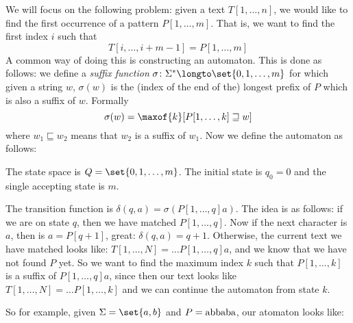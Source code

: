 We will focus on the following problem: given a text $T[1,\dots,n]$, we would like to find the first occurrence of a pattern $P[1,\dots,m]$.
That is, we want to find the first index $i$ such that
$$ T[i,\dots,i+m-1] = P[1,\dots,m] $$
A common way of doing this is constructing an automaton.
This is done as follows: we define a {\it suffix function} $\sigma\colon\Sigma^*\longto\set{0,1,\dots,m}$ for which given a string $w$, $\sigma(w)$ is the (index of the end of the) longest prefix of $P$
which is also a suffix of $w$.
Formally
$$ \sigma(w) = \maxof{k}[{P[1,\dots,k]\sqsupseteq w}] $$
where $w_1\sqsubseteq w_2$ means that $w_2$ is a suffix of $w_1$.
Now we define the automaton as follows:
\benum
    \item The state space is $Q=\set{0,1,\dots,m}$.
    The initial state is $q_0=0$ and the single accepting state is $m$.
    \item The transition function is $\delta(q,a)=\sigma(P[1,\dots,q]a)$.
\eenum
The idea is as follows: if we are on state $q$, then we have matched $P[1,\dots,q]$.
Now if the next character is $a$, then is $a=P[q+1]$, great: $\delta(q,a)=q+1$.
Otherwise, the current text we have matched looks like: $T[1,\dots,N]=\dots P[1,\dots,q]a$, and we know that we have not found $P$ yet.
So we want to find the maximum index $k$ such that $P[1,\dots,k]$ is a suffix of $P[1,\dots,q]a$, since then our text looks like $T[1,\dots,N]=\dots P[1,\dots,k]$ and we can continue the automaton from state
$k$.

So for example, given $\Sigma=\set{a,b}$ and $P={\rm abbaba}$, our atomaton looks like:

\kern1cm

\centerline{}


